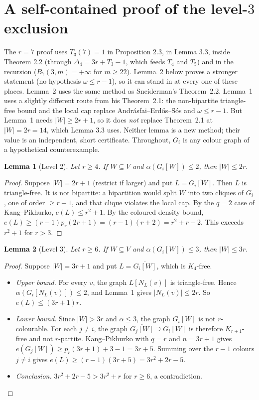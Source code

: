\documentclass[11pt]{amsart}
\newtheorem{lemma}{Lemma}
\theoremstyle{remark}\newtheorem*{remark}{Remark}
\begin{document}
\section{A self-contained proof of the level-$3$ exclusion}
The $r=7$ proof uses $T_3(7)=1$ in Proposition 2.3, in Lemma 3.3, inside Theorem 2.2 (through $\Delta_4=3r+T_3-1$, which feeds
$T_4$ and $T_5$) and in the recursion ($B_7(3,m)=+\infty$ for $m\ge22$). Lemma~2 below proves a stronger statement (no hypothesis
$\omega\le r-1$), so it can stand in at every one of these places. Lemma~2 uses the same method as Sneiderman's Theorem~2.2.
Lemma~1 uses a slightly different route from his Theorem~2.1: the non-bipartite triangle-free bound and the local cap replace
Andr\'asfai--Erd\H{o}s--S\'os and $\omega\le r-1$. But Lemma~1 needs $|W|\ge2r+1$, so it does \emph{not} replace Theorem~2.1 at
$|W|=2r=14$, which Lemma 3.3 uses. Neither lemma is a new method; their value is an independent, short certificate.
Throughout, $G_i$ is any colour graph of a hypothetical counterexample.

\begin{lemma}[Level 2]
Let $r\ge4$. If $W\subseteq V$ and $\alpha(G_i[W])\le2$, then $|W|\le 2r$.
\end{lemma}
\begin{proof}
Suppose $|W|=2r+1$ (restrict if larger) and put $L=\overline{G_i[W]}$. Then $L$ is triangle-free.
It is not bipartite: a bipartition would split $W$ into two cliques of $G_i$, one of order $\ge r+1$, and that clique violates the local cap.
By the $q=2$ case of Kang--Pikhurko, $e(L)\le r^2+1$. By the coloured density bound,
$e(L)\ge(r-1)p_r(2r+1)=(r-1)(r+2)=r^2+r-2$. This exceeds $r^2+1$ for $r>3$.
\end{proof}

\begin{lemma}[Level 3]
Let $r\ge6$. If $W\subseteq V$ and $\alpha(G_i[W])\le3$, then $|W|\le 3r$.
\end{lemma}
\begin{proof}
Suppose $|W|=3r+1$ and put $L=\overline{G_i[W]}$, which is $K_4$-free.
\begin{itemize}
\item \emph{Upper bound.} For every $v$, the graph $L[N_L(v)]$ is triangle-free. Hence $\alpha(G_i[N_L(v)])\le2$, and Lemma~1 gives
  $|N_L(v)|\le2r$. So $e(L)\le (3r+1)r$.
\item \emph{Lower bound.} Since $|W|>3r$ and $\alpha\le3$, the graph $G_i[W]$ is not $r$-colourable. For each $j\ne i$, the graph
  $\overline{G_j[W]}\supseteq G_i[W]$ is therefore $K_{r+1}$-free and not $r$-partite. Kang--Pikhurko with $q=r$ and $n=3r+1$ gives
  $e(G_j[W])\ge p_r(3r+1)+3-1=3r+5$. Summing over the $r-1$ colours $j\neq i$ gives $e(L)\ge(r-1)(3r+5)=3r^2+2r-5$.
\item \emph{Conclusion.} $3r^2+2r-5>3r^2+r$ for $r\ge6$, a contradiction.
\end{itemize}
\end{proof}
\end{document}
